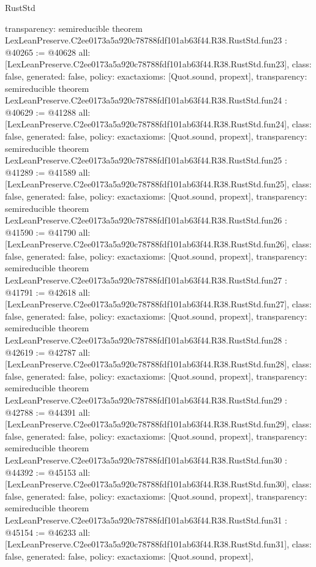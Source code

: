 \begin{lexlean}{RustStd}
\begin{coremodule}
{  transparency: semireducible
}
theorem LexLeanPreserve.C2ee0173a5a920c78788fdf101ab63f44.R38.RustStd.fun23 : @40265 := @40628 {
  all: [LexLeanPreserve.C2ee0173a5a920c78788fdf101ab63f44.R38.RustStd.fun23],
  class: false,
  generated: false,
  policy: exact{axioms: [Quot.sound, propext]},
  transparency: semireducible
}
theorem LexLeanPreserve.C2ee0173a5a920c78788fdf101ab63f44.R38.RustStd.fun24 : @40629 := @41288 {
  all: [LexLeanPreserve.C2ee0173a5a920c78788fdf101ab63f44.R38.RustStd.fun24],
  class: false,
  generated: false,
  policy: exact{axioms: [Quot.sound, propext]},
  transparency: semireducible
}
theorem LexLeanPreserve.C2ee0173a5a920c78788fdf101ab63f44.R38.RustStd.fun25 : @41289 := @41589 {
  all: [LexLeanPreserve.C2ee0173a5a920c78788fdf101ab63f44.R38.RustStd.fun25],
  class: false,
  generated: false,
  policy: exact{axioms: [Quot.sound, propext]},
  transparency: semireducible
}
theorem LexLeanPreserve.C2ee0173a5a920c78788fdf101ab63f44.R38.RustStd.fun26 : @41590 := @41790 {
  all: [LexLeanPreserve.C2ee0173a5a920c78788fdf101ab63f44.R38.RustStd.fun26],
  class: false,
  generated: false,
  policy: exact{axioms: [Quot.sound, propext]},
  transparency: semireducible
}
theorem LexLeanPreserve.C2ee0173a5a920c78788fdf101ab63f44.R38.RustStd.fun27 : @41791 := @42618 {
  all: [LexLeanPreserve.C2ee0173a5a920c78788fdf101ab63f44.R38.RustStd.fun27],
  class: false,
  generated: false,
  policy: exact{axioms: [Quot.sound, propext]},
  transparency: semireducible
}
theorem LexLeanPreserve.C2ee0173a5a920c78788fdf101ab63f44.R38.RustStd.fun28 : @42619 := @42787 {
  all: [LexLeanPreserve.C2ee0173a5a920c78788fdf101ab63f44.R38.RustStd.fun28],
  class: false,
  generated: false,
  policy: exact{axioms: [Quot.sound, propext]},
  transparency: semireducible
}
theorem LexLeanPreserve.C2ee0173a5a920c78788fdf101ab63f44.R38.RustStd.fun29 : @42788 := @44391 {
  all: [LexLeanPreserve.C2ee0173a5a920c78788fdf101ab63f44.R38.RustStd.fun29],
  class: false,
  generated: false,
  policy: exact{axioms: [Quot.sound, propext]},
  transparency: semireducible
}
theorem LexLeanPreserve.C2ee0173a5a920c78788fdf101ab63f44.R38.RustStd.fun30 : @44392 := @45153 {
  all: [LexLeanPreserve.C2ee0173a5a920c78788fdf101ab63f44.R38.RustStd.fun30],
  class: false,
  generated: false,
  policy: exact{axioms: [Quot.sound, propext]},
  transparency: semireducible
}
theorem LexLeanPreserve.C2ee0173a5a920c78788fdf101ab63f44.R38.RustStd.fun31 : @45154 := @46233 {
  all: [LexLeanPreserve.C2ee0173a5a920c78788fdf101ab63f44.R38.RustStd.fun31],
  class: false,
  generated: false,
  policy: exact{axioms: [Quot.sound, propext]},
}
\end{coremodule}
\end{lexlean}
